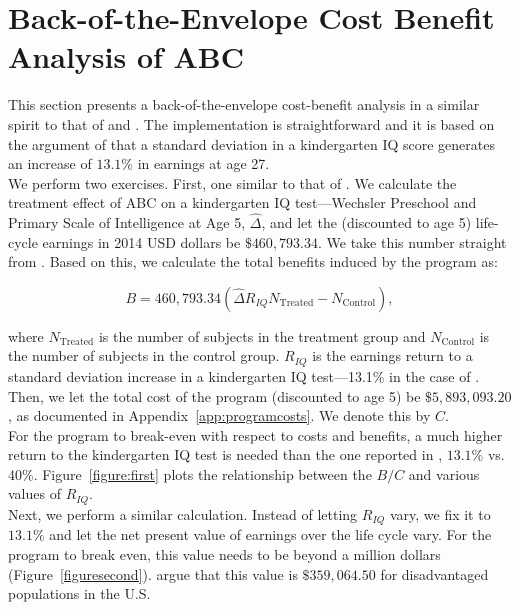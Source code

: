 
\section{Back-of-the-Envelope Cost Benefit Analysis of ABC} \label{appendix:back}

\noindent This section presents a back-of-the-envelope cost-benefit analysis in a similar spirit to that of \citet{Chetty_Friedman_etal_2010_HowDoesYour} and \citet{Kline-Walters_2015_NBER-Evaluating}. The implementation is straightforward and it is based on the argument of  \citet{Chetty_Friedman_etal_2010_HowDoesYour} that a standard deviation in a kindergarten IQ score generates an increase of $13.1\%$ in earnings at age 27.\\

\noindent We perform two exercises. First, one similar to that of \citet{Kline-Walters_2015_NBER-Evaluating}. We calculate the treatment effect of ABC on a kindergarten IQ test---Wechsler Preschool and Primary Scale of Intelligence at Age 5, $\widehat{\Delta}$, and let the (discounted to age 5) life-cycle earnings in 2014 USD dollars be $\$460,793.34$. We take this number straight from \citet{Kline-Walters_2015_NBER-Evaluating}. Based on this, we calculate the total benefits induced by the program as: 

\begin{equation}
B = 460,793.34 \left( \widehat{\Delta} R_{IQ}  N_{\text{Treated}}  -  N_{\text{Control}} \right) , 
\end{equation}

\noindent where $N_{\text{Treated}}$ is the number of subjects in the treatment group and $N_{\text{Control}}$ is the number of subjects in the control group. $R_{IQ}$ is the earnings return to a standard deviation increase in a kindergarten IQ test---13.1\% in the case of \citep{Chetty_Friedman_etal_2010_HowDoesYour}. Then, we let the total cost of the program (discounted to age 5) be $\$5,893,093.20$, as documented in Appendix~\ref{app:programcosts}. We denote this by $C$.\\ 

\noindent For the program to break-even with respect to costs and benefits, a much higher return to the kindergarten IQ test is needed than the one reported in \citep{Chetty_Friedman_etal_2010_HowDoesYour}, $13.1\%$ vs. $40\%$. Figure~\ref{figure:first} plots the relationship between the $B/C$ and various values of $R_{IQ}$.\\ 

\noindent Next, we perform a similar calculation. Instead of letting $R_{IQ}$ vary, we fix it to $13.1\%$ and let the net present value of earnings over the life cycle vary. For the program to break even, this value needs to be beyond a million dollars (Figure~\ref{figuresecond}). \citet{Kline-Walters_2015_NBER-Evaluating} argue that this value is $\$359,064.50$ for disadvantaged populations in the U.S.

